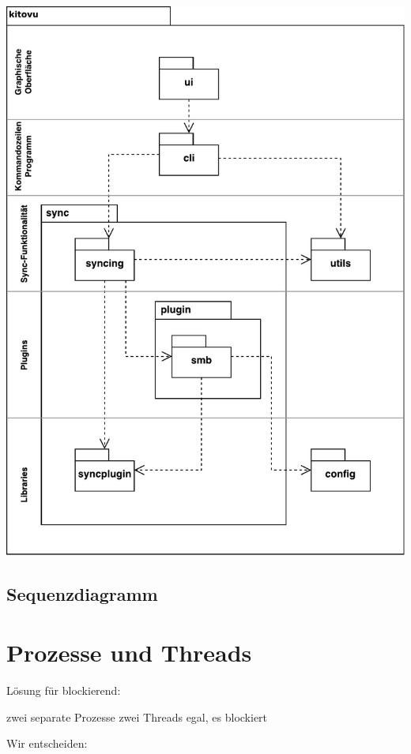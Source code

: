 \documentclass[a4paper]{article}
\let\oldsection\section
\renewcommand\section{\clearpage\oldsection}
\begin{document}
\includegraphics[width=40em]{./img/schichtendiagramm.pdf}

\subsection{Sequenzdiagramm}

\section{Prozesse und Threads}


Lösung für blockierend:

zwei separate Prozesse
zwei Threads
egal, es blockiert

Wir entscheiden:
\end{document}
